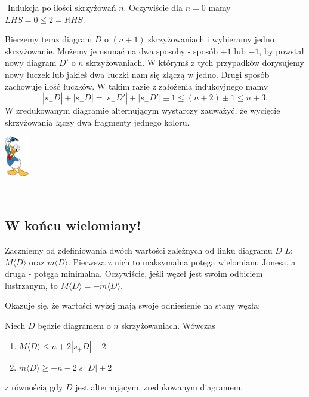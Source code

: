\documentclass{article}
\renewenvironment{proof}{{\bfseries\color{orange} Dowód}$ $\newline}{
  \begin{flushright}\includegraphics[width=30pt]{Donald_Duck.png}\end{flushright}$ $\newline
}
\begin{document}
\begin{proof}
  Indukcja po ilości skrzyżowań $n$. Oczywiście dla $n=0$ mamy $LHS=0\leq 2=RHS$.

  Bierzemy teraz diagram $D$ o $(n+1)$ skrzyżowaniach i wybieramy jedno skrzyżowanie. Możemy je usunąć na dwa sposoby - sposób $+1$ lub $-1$, by powstał nowy diagram $D'$ o $n$ skrzyżowaniach. W którymś z tych przypadków dorysujemy nowy łuczek lub jakieś dwa łuczki nam się złączą w jedno. Drugi sposób zachowuje ilość łuczków. W takim razie z założenia indukcyjnego mamy
  $$|s_+D|+|s_-D|=|s_+D'|+|s_-D'|\pm 1\leq (n+2)\pm 1\leq n+3.$$
  W zredukowanym diagramie alternującym wystarczy zauważyć, że wycięcie skrzyżowania łączy dwa fragmenty jednego koloru.
\end{proof}

\subsection{W końcu wielomiany!}

Zaczniemy od zdefiniowania dwóch wartości zależnych od linku diagramu $D$ $L$: $M\langle D\rangle$ oraz $m\langle D\rangle$. Pierwsza z nich to maksymalna potęga wielomianu Jonesa, a druga - potęga minimalna. Oczywiście, jeśli węzeł jest swoim odbiciem lustrzanym, to $M\langle D\rangle = -m\langle D\rangle$.

Okazuje się, że wartości wyżej mają swoje odniesienie na stany węzła:
\begin{fuck}
  Niech $D$ będzie diagramem o $n$ skrzyżowaniach. Wówczas
  \begin{enumerate}
    \item $M\langle D\rangle \leq n+2|s_+D|-2$
    \item $m\langle D\rangle \geq -n-2|s_-D|+2$
  \end{enumerate}
  z równością gdy $D$ jest alternującym, zredukowanym diagramem.
\end{fuck}
\end{document}
